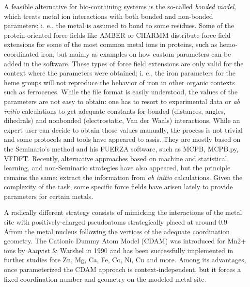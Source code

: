A feasible alternative for bio-containing systems is the so-called \textit{bonded model}, which treats metal ion interactions with both bonded and non-bonded parameters; i. e., the metal is assumed to bond to some residues. Some of the protein-oriented force fields like AMBER\cite{amber} or CHARMM\cite{brooks1983} distribute force field extensions for some of the most common metal ions in proteins, such as hemo-coordinated iron, but mainly as examples on how custom parameters can be added in the software. These types of force field extensions are only valid for the context where the parameters were obtained; i. e., the iron parameters for the heme groups will not reproduce the behavior of iron in other organic contexts such as ferrocenes. While the file format is easily understood, the values of the parameters are not easy to obtain: one has to resort to experimental data or \textit{ab initio} calculations to get adequate constants for bonded (distances, angles, dihedrals) and nonbonded (electrostatic, Van der Waals) interactions. While an expert user can decide to obtain those values manually, the process is not trivial and some protocols and tools have appeared to assis. They are mostly based on the Seminario's method and his FUERZA software,\cite{Seminario1996} such as MCPB, MCPB.py,\cite{li2016} VFDFT.\cite{zheng2016} Recently, alternative approaches based on machine and statistical learning, \cite{fracchia2017,li2017b} and non-Seminario strategies\cite{Burger2012, allen2017} have also appeared, but the principle remains the same: extract the information from \textit{ab initio} calculations. Given the complexity of the task, some specific force fields have arisen lately to provide parameters for certain metals.\cite{Huey_2007,Bureekaew_2013,Addicoat_2014,Landis_2007,Shi_2003,Rappe_1993,Nielson_2005}

A radically different strategy consists of mimicking the interactions of the metal site with positively-charged pseudoatoms strategically placed at around 0.9 \AA from the metal nucleus following the vertices of the adequate coordination geometry. The Cationic Dummy Atom Model (CDAM) was introduced for Mn2+ ions by Aaqvist $\&$  Warshel in 1990\cite{aaqvist1990} and has been successfully implemented in further studies fore Zn, Mg, Ca, Fe, Co, Ni, Cu and more.\cite{duarte2014,lu2012proteins,Oelschlaeger_2007,Saxena_2013,Saxena_2014,Liao_2015,Pang_1999} Among its advantages, once parameterized the CDAM approach is context-independent, but it forces a fixed coordination number and geometry on the modeled metal site.

